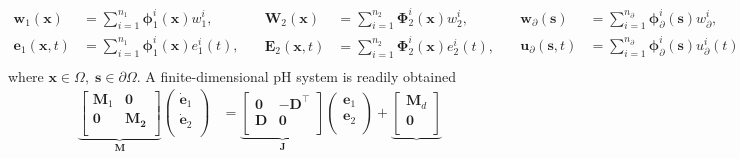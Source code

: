 \documentclass{svjour3}                     %
\newcommand{\firstRev}[1]{\textcolor{red!80!black}{#1}}
\begin{document}
\firstRev{
\begin{equation*}
\begin{aligned}
\bm{w}_1(\bm{x}) &= \sum_{i=1}^{n_1} \bm{\phi}_1^i(\bm{x}) {w}_1^i, \\
\bm{e}_1(\bm{x},t) &= \sum_{i=1}^{n_1} \bm{\phi}_1^i(\bm{x}) {e}_1^i(t), \\
\end{aligned} \quad
\begin{aligned}
\bm{W}_2(\bm{x}) &= \sum_{i=1}^{n_2} \bm{\Phi}_2^i(\bm{x}) {w}_2^i, \\
\bm{E}_2(\bm{x},t) &= \sum_{i=1}^{n_2} \bm{\Phi}_2^i(\bm{x}) {e}_2^i(t), \\
\end{aligned} \quad 
\begin{aligned}
\bm{w}_\partial(\bm{s}) &= \sum_{i=1}^{n_\partial} \bm{\phi}_\partial^i(\bm{s}) w_\partial^i, \\
\bm{u}_\partial(\bm{s},t) &= \sum_{i=1}^{n_\partial} \bm{\phi}_\partial^i(\bm{s}) u_\partial^i(t), \\
\end{aligned}
\end{equation*}
where $\bm{x} \in \Omega, \; \bm{s} \in \partial\Omega$.} A finite-dimensional pH system is readily obtained\firstRev{
\begin{equation}\label{eq:findimEl_ex}
\begin{aligned}
\underbrace{\begin{bmatrix}
\mathbf{M}_1 & \mathbf{0} \\
\mathbf{0} & \mathbf{M_2} \\
\end{bmatrix}}_{\mathbf{M}}
\begin{pmatrix}
\dot{\mathbf{e}}_1 \\
\dot{\mathbf{e}}_2 \\
\end{pmatrix} &= \underbrace{\begin{bmatrix}
\mathbf{0} & -\mathbf{D}^\top \\
\mathbf{D} & \mathbf{0} \\
\end{bmatrix}}_{\mathbf{J}}
\begin{pmatrix}
\mathbf{e}_{1} \\
\mathbf{e}_{2} \\
\end{pmatrix} + 
\underbrace{\begin{bmatrix}
\mathbf{M}_{d}\\
\mathbf{0}\\

\end{bmatrix}}
\end{aligned}
\end{equation}}
\end{document}

